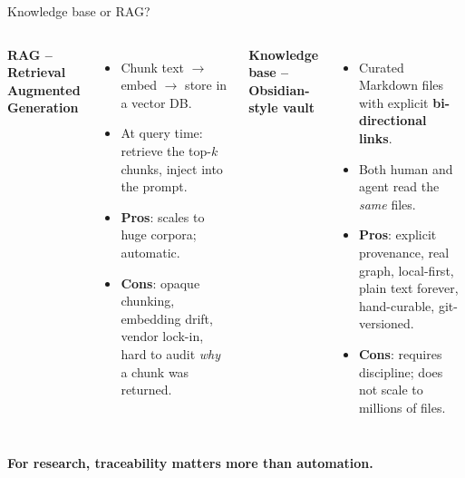 \begin{frame}{Knowledge base or RAG?}
  \begin{columns}[T,onlytextwidth]
      \textbf{RAG -- Retrieval Augmented Generation \citep{lewis_neurips_2020}}
      \begin{itemize}\setlength\itemsep{0.25em}
        \item Chunk text $\rightarrow$ embed $\rightarrow$ store in a vector DB.
        \item At query time: retrieve the top-$k$ chunks, inject into the prompt.
        \item \textbf{Pros}: scales to huge corpora; automatic.
        \item \textbf{Cons}: opaque chunking, embedding drift, vendor lock-in, hard to audit \emph{why} a chunk was returned.
      \end{itemize}
      \textbf{Knowledge base -- Obsidian-style vault \citep{obsidian_docs}}
      \begin{itemize}\setlength\itemsep{0.25em}
        \item Curated Markdown files with explicit \textbf{bi-directional links}.
        \item Both human and agent read the \emph{same} files.
        \item \textbf{Pros}: explicit provenance, real graph, local-first, plain text forever, hand-curable, git-versioned.
        \item \textbf{Cons}: requires discipline; does not scale to millions of files.
      \end{itemize}
  \end{columns}
  \vspace{0.3cm}
  \begin{center}\large\color{deepblue}\bfseries For research, traceability matters more than automation.\end{center}
\end{frame}

